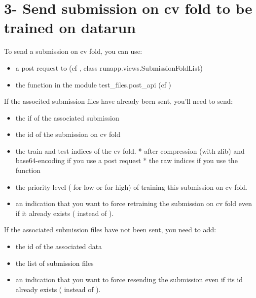\documentclass[letterpaper,10pt,english]{sphinxmanual}
\begin{document}
\section{3- Send submission on cv fold to be trained on datarun}
\label{modules/workflow:send-submission-on-cv-fold-to-be-trained-on-datarun}
To send a submission on cv fold, you can use:
\begin{itemize}
\item {} 
a post request to  (cf {\hyperref[modules/views:requestsdirect]{}}, class runapp.views.SubmissionFoldList)

\item {} 
the  function in the module test\_files.post\_api (cf {\hyperref[modules/views:requestsmodule]{}})

\end{itemize}

If the associted submission files have already been sent, you'll need to send:
\begin{itemize}
\item {} 
the if of the associated submission

\item {} 
the id of the submission on cv fold

\item {} 
the train and test indices of the cv fold.
* after compression (with zlib) and base64-encoding if you use a post request
* the raw indices if you use the  function

\item {} 
the priority level ( for low or  for high) of training this submission on cv fold.

\item {} 
an indication that you want to force retraining the submission on cv fold even if it already exists ( instead of ).

\end{itemize}

If the associated submission files have not been sent, you need to add:
\begin{itemize}
\item {} 
the id of the associated data

\item {} 
the list of submission files

\item {} 
an indication that you want to force resending the submission even if its id already exists ( instead of ).

\end{itemize}
\end{document}
